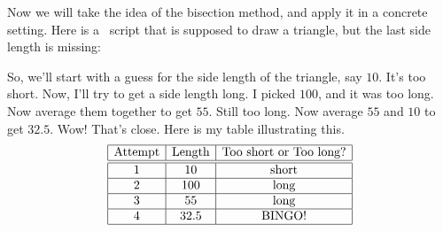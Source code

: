 \documentclass[handout,nooutcomes,noauthor]{ximera}
\begin{document}
\begin{question}
  Now we will take the idea of the bisection method, and apply it in a
  concrete setting.  Here is a \snap\ script that is supposed to draw
  a triangle, but the last side length is missing:
  
  \begin{freeResponse}
    So, we'll start with a guess for the side length of the triangle,
    say $10$. It's too short. Now, I'll try to get a side length
    long. I picked $100$, and it was too long. Now average them
    together to get $55$. Still too long. Now average $55$ and $10$ to get $32.5$. Wow! That's close.  Here is my table
    illustrating this.
    \[
  \begin{array}{|c|c|c|c|}\hline
    \text{Attempt} & \text{Length} & \text{Too short or Too long?} \\ \hline\hline
    1 & 10 & \text{short} \\ \hline
    2 & 100 & \text{long} \\ \hline
    3 & 55 & \text{long} \\ \hline
    4 & 32.5 & \text{BINGO!} \\ \hline
  \end{array}
  \]
\end{freeResponse}
\end{question}
\mynewpage
\end{document}
